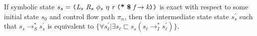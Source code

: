 % 
%

\begin{lemma}
\label{lem:init}
If symbolic state $s_s = \lp \cfgnt{L}_s\ \cfgnt{R}_{s}\ \phi_s\ \eta\ \cfgnt{r}\ \lp \cfgt{*}\ \cfgt{\$}\ \cfgnt{f} \rightarrow \cfgnt{k}\rp \rp$ is exact with respect to some initial state $s_0$ and control flow path $\pi_n$, then the intermediate state state $s_s^\prime$ such that $s_s \rightarrow_S^* s_s^\prime$ is equivalent to $\{\forall s_\ell^\prime | \exists s_\ell \sqsubset s_s (s_\ell \rightarrow_I^* s_\ell^\prime)  \}$.
\end{lemma}

